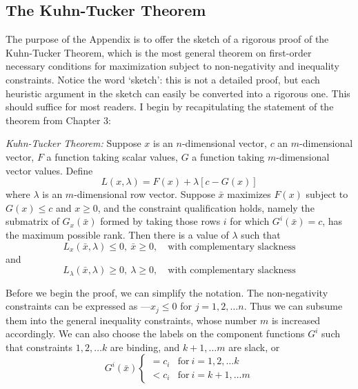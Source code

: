 
\begin{appendices}
\chapter{The Kuhn-Tucker Theorem} 
  


The purpose of the Appendix is to offer the sketch of a rigorous proof of the Kuhn-Tucker Theorem, which is the most general theorem on first-order necessary conditions for maximization subject to non-negativity and inequality constraints. Notice the word `sketch': this is not a detailed proof, but each heuristic argument in the sketch can easily be converted into a rigorous one. This should suffice for most readers. I begin by recapitulating the statement of the theorem from Chapter 3:

\textit{Kuhn-Tucker Theorem:} Suppose $x$ is an $n$-dimensional vector, $c$ an $m$-dimensional vector, $F$ a function taking scalar values, $G$ a
function taking $m$-dimensional vector values. Define
\begin{equation*} \tag{3.4}
 L(x, \lambda) = F(x) + \lambda [c-G(x)]
\end{equation*}
where $\lambda$ is an $m$-dimensional row vector. Suppose $\bar{x}$ maximizes $F(x)$ subject to $G(x) \leq c$ and $x \geq 0$, and the constraint qualification holds, namely the submatrix of $G_x(\bar{x})$ formed by taking those rows $i$ for which $G^i(\bar{x}) = c$, has the maximum possible rank. Then there is a value of $\lambda$ such that
\begin{equation*} \tag{3.7}
L_x(\bar{x}, \lambda) \leq 0, \ \bar{x} \geq 0, \quad \mbox{with complementary slackness}
\end{equation*}
and
\begin{equation*} \tag{3.10}
L_\lambda(\bar{x}, \lambda) \geq 0,  \ \lambda \geq 0, \quad \mbox{with complementary slackness}
\end{equation*}

Before we begin the proof, we can simplify the notation. The non-negativity constraints can be expressed as $—x_j \leq 0 $ for $j = 1,2, \dots n$. Thus we can subsume them into the general inequality constraints, whose number $m$ is increased accordingly. We can also choose the labels on the component functions $G^i$ such that constraints $1, 2, \dots k$ are binding, and $k + 1, \dots m$ are slack, or
\begin{equation} \label{equaA.1}
G^i(\bar{x}) \left\{  \begin{array}{ll}
= c_i & \mbox{for} \  i=1,2,\dots k \\
< c_i & \mbox{for} \ i = k+1, \dots m 
\end{array}
\right.
\end{equation}


\end{appendices}
